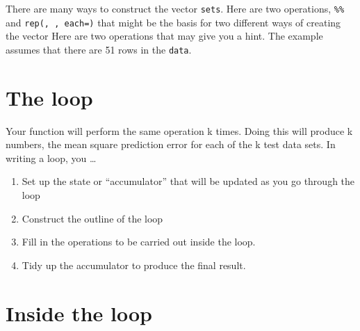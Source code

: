 \documentclass[]{tufte-handout}
\providecommand{\tightlist}{%
  \setlength{\itemsep}{0pt}\setlength{\parskip}{0pt}}
\begin{document}
There are many ways to construct the vector \texttt{sets}.
Here are two operations, \texttt{\%\%} and \texttt{rep(,\ ,\ each=)}
that might be the basis for two different ways of creating the vector
Here are two operations that may give you a hint. The example assumes
that there are 51 rows in the \texttt{data}.

\section{The loop}\label{the-loop}

Your function will perform the same operation k times. Doing this will
produce k numbers, the mean square prediction error for each of the k
test data sets. In writing a loop, you \ldots{}


\begin{enumerate}
\def\labelenumi{\arabic{enumi}.}
\tightlist
\item
  Set up the
  state
  or ``accumulator'' that will be updated as you go through the loop
\item
  Construct the outline of the loop
\item
  Fill in the operations to be carried out inside the loop.
\item
  Tidy up the accumulator to produce the final result.
\end{enumerate}

\section{Inside the loop}\label{inside-the-loop}
\end{document}
